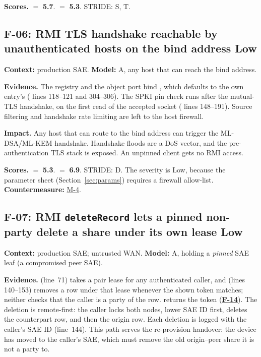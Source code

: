 \documentclass[11pt,a4paper]{article}
\newcommand{\sev}[1]{\textbf{#1}}
\newcommand{\fid}[1]{\textbf{#1}}
\begin{document}
\textbf{Scores.}  $=$ \textbf{5.7}.  $=$ \textbf{5.3}. STRIDE: S, T.

\subsection*{F-06: RMI TLS handshake reachable by unauthenticated hosts on the bind address \hfill \sev{Low}}\label{f:F-06}
\textbf{Context:} production SAE. \textbf{Model:} A, any host that can reach the bind address.

\textbf{Evidence.} The registry and the object port bind , which defaults to the own entry's  ( lines 118--121 and 304--306). The SPKI pin check runs after the mutual-TLS handshake, on the first read of the accepted socket ( lines 148--191). Source filtering and handshake rate limiting are left to the host firewall.

\textbf{Impact.} Any host that can route to the bind address can trigger the ML-DSA/ML-KEM handshake. Handshake floods are a DoS vector, and the pre-authentication TLS stack is exposed. An unpinned client gets no RMI access.

\textbf{Scores.}  $=$ \textbf{5.3}.  $=$ \textbf{6.9}. STRIDE: D. The severity is Low, because the parameter sheet (Section~\ref{sec:params}) requires a firewall allow-list. \textbf{Countermeasure:} \hyperref[m:M-4]{M-4}.

\subsection*{F-07: RMI \texttt{deleteRecord} lets a pinned non-party delete a share under its own lease \hfill \sev{Low}}\label{f:F-07}
\textbf{Context:} production SAE; untrusted WAN. \textbf{Model:} A, holding a \emph{pinned} SAE leaf (a compromised peer SAE).

\textbf{Evidence.}  (line~71) takes a pair lease for any authenticated caller, and  (lines 140--153) removes a row under that lease whenever the shown token matches; neither checks that the caller is a party of the row.  returns the token (\hyperref[f:F-14]{\fid{F-14}}). The deletion is remote-first: the caller locks both nodes, lower SAE ID first, deletes the counterpart row, and then the origin row. Each deletion is logged with the caller's SAE ID (line~144). This path serves the re-provision handover: the device has moved to the caller's SAE, which must remove the old origin--peer share it is not a party to.
\end{document}
